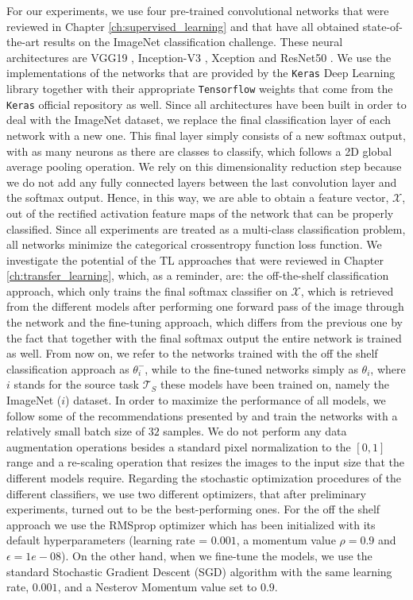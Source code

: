 For our experiments, we use four pre-trained convolutional networks that were reviewed in Chapter \ref{ch:supervised_learning} and that have all obtained state-of-the-art results on the ImageNet classification challenge. These neural architectures are VGG19 \cite{simonyan2014very}, Inception-V3 \cite{szegedy2016rethinking}, Xception \cite{chollet2016xception} and ResNet50 \cite{xie2017aggregated}. We use the implementations of the networks that are provided by the \texttt{Keras} Deep Learning library \cite{chollet2015keras} together with their appropriate \texttt{Tensorflow} weights \cite{abadi2016tensorflow} that come from the \texttt{Keras} official repository as well. Since all architectures have been built in order to deal with the ImageNet dataset, we replace the final classification layer of each network with a new one. This final layer simply consists of a new softmax output, with as many neurons as there are classes to classify, which follows a 2D global average pooling operation. We rely on this dimensionality reduction step because we do not add any fully connected layers between the last convolution layer and the softmax output. Hence, in this way, we are able to obtain a feature vector, $\mathscr{X}$, out of the rectified activation feature maps of the network that can be properly classified. Since all experiments are treated as a multi-class classification problem, all networks minimize the categorical crossentropy function loss function. We investigate the potential of the TL approaches that were reviewed in Chapter \ref{ch:transfer_learning}, which, as a reminder, are: the off-the-shelf classification approach, which only trains the final softmax classifier on $\mathscr{X}$, which is retrieved from the different models after performing one forward pass of the image through the network and the fine-tuning approach, which differs from the previous one by the fact that together with the final softmax output the entire network is trained as well. 
From now on, we refer to the networks trained with the off the shelf classification approach as $\theta^{-}_{i}$, while to the fine-tuned networks simply as $\theta_{i}$, where $i$ stands for the source task $\mathcal{T}_S$ these models have been trained on, namely the ImageNet ($i$) dataset. In order to maximize the performance of all models, we follow some of the recommendations presented by \citet{masters2018revisiting} and train the networks with a relatively small batch size of $32$ samples. We do not perform any data augmentation operations besides a standard pixel normalization to the $[0, 1]$ range and a re-scaling operation that resizes the images to the input size that the different models require. Regarding the stochastic optimization procedures of the different classifiers, we use two different optimizers, that after preliminary experiments, turned out to be the best-performing ones. For the off the shelf approach we use the RMSprop optimizer \cite{tieleman2012lecture} which has been initialized with its default hyperparameters (learning rate = $0.001$, a momentum value $\rho = 0.9$ and $\epsilon =1e-08$). On the other hand, when we fine-tune the models, we use the standard Stochastic Gradient Descent (SGD) algorithm with the same learning rate, $0.001$, and a Nesterov Momentum value set to $0.9$.
